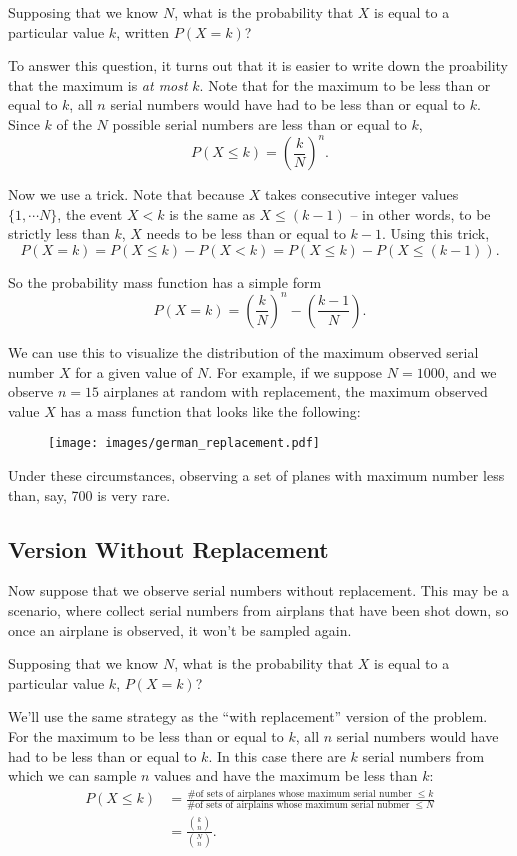 \documentclass[11pt]{article}
\begin{document}
Supposing that we know $N$, what is the probability that $X$ is equal to a particular value $k$, written $P(X = k)$?

To answer this question, it turns out that it is easier to write down the proability that the maximum is \emph{at most} $k$.
Note that for the maximum to be less than or equal to $k$, all $n$ serial numbers would have had to be less than or equal to $k$.
Since $k$ of the $N$ possible serial numbers are less than or equal to $k$,
$$
P(X \leq k) = \left(\frac{k}{N}\right)^n.
$$

Now we use a trick. Note that because $X$ takes consecutive integer values $\{1, \cdots N\}$, the event $X < k$ is the same as
$X \leq (k-1)$ -- in other words, to be strictly less than $k$, $X$ needs to be less than or equal to $k-1$. Using this trick,
$$
P(X = k) = P(X \leq k) - P(X < k) = P(X \leq k) - P(X \leq (k-1)).
$$

So the probability mass function has a simple form
$$
P(X = k) = \left(\frac{k}{N}\right)^n - \left(\frac{k-1}{N}\right).
$$

We can use this to visualize the distribution of the maximum observed serial number $X$ for a given value of $N$. For example,
if we suppose $N = 1000$, and we observe $n = 15$ airplanes at random with replacement, the maximum observed value $X$ has a
mass function that looks like the following:

\begin{figure}[h!]
    \centering
    \texttt{[image: images/german\_replacement.pdf]}
\end{figure}

Under these circumstances, observing a set of planes with maximum number less than, say, 700 is very rare.

\subsection*{Version Without Replacement}
Now suppose that we observe serial numbers without replacement. This may be a scenario,
where collect serial numbers from airplans that have been shot down, so once an airplane is observed,
it won't be sampled again.

Supposing that we know $N$, what is the probability that $X$ is equal to a particular value $k$, $P(X = k)$?

We'll use the same strategy as the ``with replacement'' version of the problem.
For the maximum to be less than or equal to $k$, all $n$ serial numbers would have had to be less than or equal to $k$.
In this case there are $k$ serial numbers from which we can sample $n$ values and have the maximum be less than $k$:
\begin{align*}
    P(X \leq k) &= \frac{\textrm{\# of sets of airplanes whose maximum serial number $\leq k$}}{\textrm{\# of sets of airplains whose maximum serial nubmer $\leq N$}}\\
                &= \frac{{k \choose n}}{{N \choose n}}
.
\end{align*}
\end{document}

